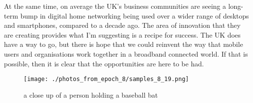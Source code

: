 \documentclass{article}%
\begin{document}
At the same time, on average the UK’s business communities are seeing a long{-}term bump in digital home networking being used over a wider range of desktops and smartphones, compared to a decade ago. The area of innovation that they are creating provides what I’m suggesting is a recipe for success.\newline%
The UK does have a way to go, but there is hope that we could reinvent the way that mobile users and organisations work together in a broadband connected world. If that is possible, then it is clear that the opportunities are here to be had.\newline%

%


\begin{figure}[h!]%
\centering%
\texttt{[image: ./photos\_from\_epoch\_8/samples\_8\_19.png]}%
\caption{a close up of a person holding a baseball bat}%
\end{figure}

%
\end{document}
